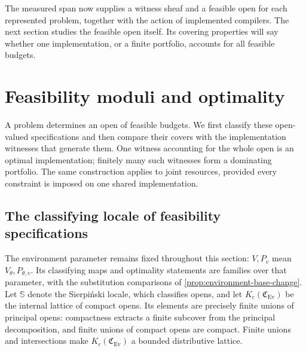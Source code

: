 \documentclass[11pt,a4paper]{article}
\numberwithin{algorithm}{section}
\numberwithin{equation}{section}
\theoremstyle{definition}
\theoremstyle{remark}
\theoremstyle{plain}
\newcommand{\Ev}{{\operatorname{Ev}}}
\newcommand{\Cplx}{\mathfrak C_{\Ev}}
\theoremstyle{definition}
\theoremstyle{plain}
\begin{document}
The measured span now supplies a witness sheaf and a feasible open
for each represented problem, together with the action of implemented
compilers. The next section studies the feasible open itself.
Its covering properties will say whether one implementation, or a
finite portfolio, accounts for all feasible budgets.

\section{Feasibility moduli and optimality}
\label{sec:feasibility-moduli}

A problem determines an open of feasible budgets. We first classify
these open-valued specifications and then compare their covers with
the implementation witnesses that generate them. One witness
accounting for the whole open is an optimal implementation; finitely
many such witnesses form a dominating portfolio. The same construction
applies to joint resources, provided every constraint is imposed on
one shared implementation.
\subsection{The classifying locale of feasibility specifications}
\label{sec:feasibility-classifier}
The environment parameter remains fixed throughout this section:
$V,P_v$ mean $V_\theta,P_{\theta,v}$. Its classifying maps and
optimality statements are families over that parameter, with the
substitution comparisons of \cref{prop:environment-base-change}.
Let $\mathbb S$ denote the Sierpi\'nski locale, which classifies
opens, and let $K_c(\Cplx)$ be the internal lattice of compact
opens. Its elements are precisely finite unions of principal
opens: compactness extracts a finite subcover from the principal
decomposition, and finite unions of compact opens are compact.
Finite unions and intersections make $K_c(\Cplx)$ a bounded
distributive lattice.
\end{document}

